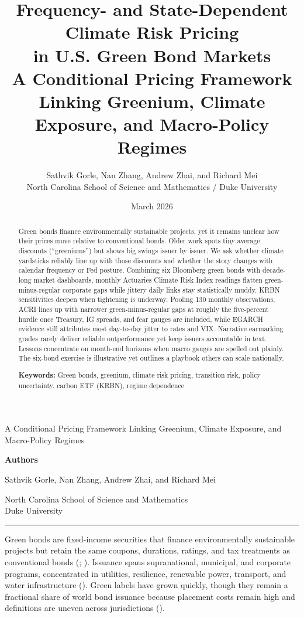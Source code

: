 \documentclass[
  11pt,
]{article}
\title{Frequency- and State-Dependent Climate Risk Pricing\\
in U.S. Green Bond Markets\\[0.4em]
\normalfont\large A Conditional Pricing Framework Linking Greenium, Climate Exposure, and Macro-Policy Regimes}
\author{Sathvik Gorle, Nan Zhang, Andrew Zhai, and Richard Mei\\[0.35em]
\normalfont\normalsize North Carolina School of Science and Mathematics / Duke University}
\date{March 2026}
\makeatletter
\renewcommand{\section}{\@startsection{section}{1}{\z@}{-2.0ex \@plus -0.5ex \@minus -.2ex}{0.8ex \@plus.2ex}{\normalfont\Large\bfseries\color{TitleBlue}}}
\def\maketitle{
\begin{titlepage}
\thispagestyle{empty}
\centering
\vspace*{2.1cm}
{\LARGE\bfseries\color{TitleBlue}\@title\par}
\vspace{0.55cm}
{\large\color{AccentBlue}A Conditional Pricing Framework Linking Greenium, Climate Exposure, and Macro-Policy Regimes\par}
\vspace{1.4cm}
{\large\textbf{Authors}\par}
\vspace{0.35cm}
{\large Sathvik Gorle, Nan Zhang, Andrew Zhai, and Richard Mei\par}
\vspace{0.20cm}
{\normalsize North Carolina School of Science and Mathematics\\
Duke University\par}
\vspace{1.4cm}
{\normalsize \@date\par}
\vfill
{\color{RuleGray}\rule{0.86\linewidth}{0.8pt}\par}
\end{titlepage}
\setcounter{page}{1}
}
\makeatother
\begin{document}
\maketitle

{
\setcounter{tocdepth}{3}
\tableofcontents
}
\begin{abstract}
\noindent Green bonds finance environmentally sustainable projects, yet it remains unclear how their prices move relative to conventional bonds. Older work spots tiny average discounts (``greeniums'') but shows big swings issuer by issuer. We ask whether climate yardsticks reliably line up with those discounts and whether the story changes with calendar frequency or Fed posture. Combining six Bloomberg green bonds with decade-long market dashboards, monthly Actuaries Climate Risk Index readings flatten green-minus-regular corporate gaps while jittery daily links stay statistically muddy. KRBN sensitivities deepen when tightening is underway. Pooling 130 monthly observations, ACRI lines up with narrower green-minus-regular gaps at roughly the five-percent hurdle once Treasury, IG spreads, and fear gauges are included, while EGARCH evidence still attributes most day-to-day jitter to rates and VIX. Narrative earmarking grades rarely deliver reliable outperformance yet keep issuers accountable in text. Lessons concentrate on month-end horizons when macro gauges are spelled out plainly. The six-bond exercise is illustrative yet outlines a playbook others can scale nationally.

\medskip
\noindent \textbf{Keywords:} Green bonds, greenium, climate risk pricing, transition risk, policy uncertainty, carbon ETF (KRBN), regime dependence
\end{abstract}

\section{Introduction}\label{introduction}

Green bonds are fixed-income securities that finance environmentally sustainable projects but retain the same coupons, durations, ratings, and tax treatments as conventional bonds (; ). Issuance spans supranational, municipal, and corporate programs, concentrated in utilities, resilience, renewable power, transport, and water infrastructure (). Green labels have grown quickly, though they remain a fractional share of world bond issuance because placement costs remain high and definitions are uneven across jurisdictions ().
\end{document}
